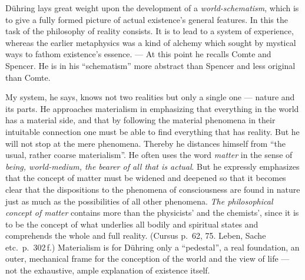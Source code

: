 \documentclass[12pt,a4paper]{book}
\begin{document}
Dühring lays great weight upon the development of a \emph{world-schematism},
which is to give a fully formed picture of actual existence's general features.
In this the task of the philosophy of reality consists. It is to lead to a system
of experience, whereas the earlier metaphysics was a kind of alchemy which sought
by mystical ways to fathom existence's essence. --- At this point he recalls
Comte and Spencer. He is in his ``schematism'' more abstract than Spencer and
less original than Comte.

My system, he says, knows not two realities but only a single one --- nature and
its parts. He approaches materialism in emphasizing that everything in the world
has a material side, and that by following the material phenomena in their
intuitable connection one must be able to find everything that has reality. But
he will not stop at the mere phenomena. Thereby he distances himself from ``the
usual, rather coarse materialism''. He often uses the word \emph{matter} in the
sense of \emph{being, world-medium, the bearer of all that is actual}. But he
expressly emphasizes that the concept of matter must be widened and deepened so
that it becomes clear that the dispositions to the phenomena of consciousness are
found in nature just as much as the possibilities of all other phenomena.
\emph{The philosophical concept of matter} contains more than the physicists' and
the chemists', since it is to be the concept of what underlies all bodily and
spiritual states and comprehends the whole and full reality. (Cursus p.~62, 75.
Leben, Sache etc.\ p.~302\,f.) Materialism is for Dühring only a ``pedestal'', a
real foundation, an outer, mechanical frame for the conception of the world and
the view of life --- not the exhaustive, ample explanation of existence itself.
\end{document}
